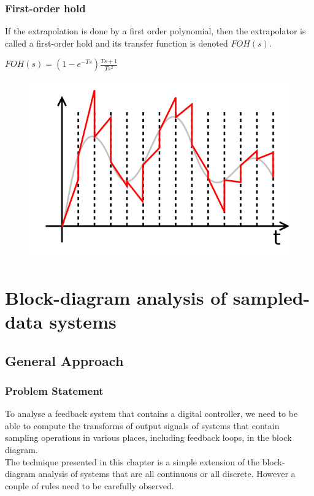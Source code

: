 \begin{frame}
	\frametitle{First-order hold}
	If the extrapolation is done by a first order polynomial, then the extrapolator is called a first-order hold and its transfer function is denoted $FOH(s)$. 
	\begin{center}
		$FOH(s)=(1-e^{-Ts})\frac{Ts+1}{Ts^2}$
	\end{center}
	\vspace{-0.5em}
	\begin{figure}
		\includegraphics[width=0.5\linewidth]{foh}
	\end{figure}
\end{frame}

\section{Block-diagram analysis of sampled-data systems}

\subsection{General Approach}

\begin{frame}
	\frametitle{Problem Statement}
	\justify
	To analyse a feedback system that contains a digital controller, we need to be able to compute the transforms of output signals of systems that contain sampling operations in various places, including feedback loops, in the block diagram.\\
	\vspace{1em}
	The technique presented in this chapter is a simple extension of the block-diagram analysis of systems that are all continuous or all discrete. However a couple of rules need to be carefully observed. 
\end{frame}

